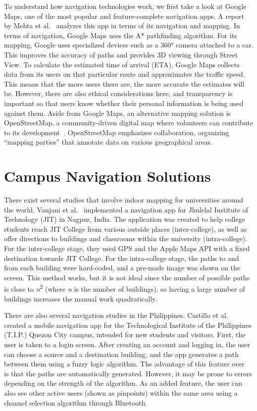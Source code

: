 To understand how navigation technologies work, we first take a look at Google
Maps, one of the most popular and feature-complete navigation apps. A report by
Mehta et al.~\cite{ref06} analyzes this app in terms of its navigation and
mapping. In terms of navigation, Google Maps uses the A* pathfinding algorithm.
For its mapping, Google uses specialized devices such as a 360° camera attached
to a car. This improves the accuracy of paths and provides 3D viewing through
Street View. To calculate the estimated time of arrival (ETA), Google Maps
collects data from its users on that particular route and approximates the
traffic speed. This means that the more users there are, the more accurate the
estimates will be. However, there are also ethical considerations here, and
transparency is important so that users know whether their personal information
is being used against them. Aside from Google Maps, an alternative mapping
solution is OpenStreetMap, a community-driven digital map where volunteers can
contribute to its development~\cite{ref07}. OpenStreetMap emphasizes
collaboration, organizing ``mapping parties'' that annotate data on various
geographical areas.

\section{Campus Navigation Solutions}\label{sec:2.3}

There exist several studies that involve indoor mapping for universities around
the world. Vanjani et al.~\cite{ref08} implemented a navigation app for Jhulelal
Institute of Technology (JIT) in Nagpur, India. The application was created to
help college students reach JIT College from various outside places
(inter-college), as well as offer directions to buildings and classrooms within
the university (intra-college). For the inter-college stage, they used GPS and
the Apple Maps API with a fixed destination towards JIT College. For the
intra-college stage, the paths to and from each building were hard-coded, and a
pre-made image was shown on the screen. This method works, but it is not ideal
since the number of possible paths is close to \emph{n}\textsuperscript{2}
(where \emph{n} is the number of buildings), so having a large number of
buildings increases the manual work quadratically.

There are also several navigation studies in the Philippines. Castillo et
al.~\cite{ref09} created a mobile navigation app for the Technological Institute
of the Philippines (T.I.P.) Quezon City campus, intended for new students and
visitors. First, the user is taken to a login screen. After creating an account
and logging in, the user can choose a source and a destination building, and the
app generates a path between them using a fuzzy logic algorithm. The advantage
of this feature over~\cite{ref08} is that the paths are automatically generated.
However, it may be prone to errors depending on the strength of the algorithm.
As an added feature, the user can also see other active users (shown as
pinpoints) within the same area using a channel selection algorithm through
Bluetooth.

